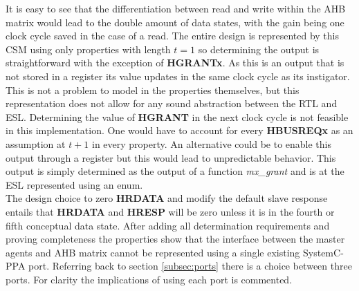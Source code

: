 It is easy to see that the differentiation between read and write within the AHB matrix would lead to the double amount of data states, with the gain being one clock cycle saved in the case of a read. The entire design is represented by this CSM using only properties with length $t=1$ so determining the output is straightforward with the exception of \textbf{HGRANTx}. As this is an output that is not stored in a register its value updates in the same clock cycle as its instigator. This is not a problem to model in the properties themselves, but this representation does not allow for any sound abstraction between the RTL and ESL. Determining the value of \textbf{HGRANT} in the next clock cycle is not feasible in this implementation. One would have to account for every \textbf{HBUSREQx} as an assumption at $t+1$ in every property. An alternative could be to enable this output through a register but this would lead to unpredictable behavior. This output is simply determined as the output of a function \textit{mx\_grant} and is at the ESL represented using an enum. \\
\newline
The design choice to zero \textbf{HRDATA} and modify the default slave response entails that \textbf{HRDATA} and \textbf{HRESP} will be zero unless it is in the fourth or fifth conceptual data state. After adding all determination requirements and proving completeness the properties show that the interface between the master agents and AHB matrix cannot be represented using a single existing SystemC-PPA port. Referring back to section \ref{subsec:ports} there is a choice between three ports. For clarity the implications of using each port is commented.
